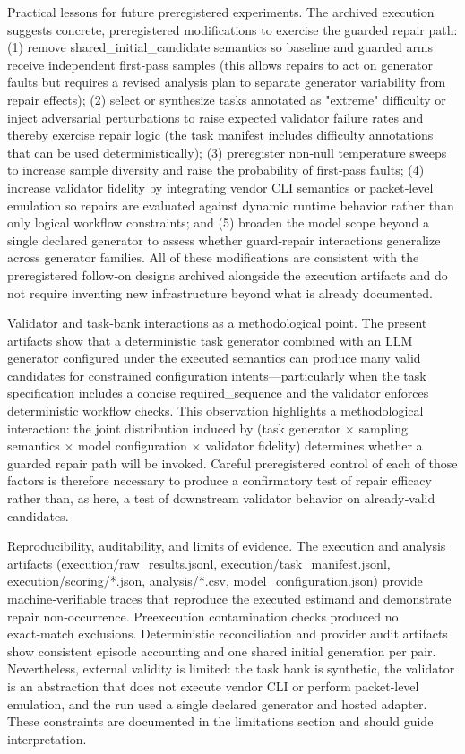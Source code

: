 \documentclass[conference]{IEEEtran}
\begin{document}
Practical lessons for future preregistered experiments. The archived execution suggests concrete, preregistered modifications to exercise the guarded repair path: (1) remove shared\_initial\_candidate semantics so baseline and guarded arms receive independent first‑pass samples (this allows repairs to act on generator faults but requires a revised analysis plan to separate generator variability from repair effects); (2) select or synthesize tasks annotated as "extreme" difficulty or inject adversarial perturbations to raise expected validator failure rates and thereby exercise repair logic (the task manifest includes difficulty annotations that can be used deterministically); (3) preregister non‑null temperature sweeps to increase sample diversity and raise the probability of first‑pass faults; (4) increase validator fidelity by integrating vendor CLI semantics or packet‑level emulation so repairs are evaluated against dynamic runtime behavior rather than only logical workflow constraints; and (5) broaden the model scope beyond a single declared generator to assess whether guard‑repair interactions generalize across generator families. All of these modifications are consistent with the preregistered follow‑on designs archived alongside the execution artifacts and do not require inventing new infrastructure beyond what is already documented.

Validator and task‑bank interactions as a methodological point. The present artifacts show that a deterministic task generator combined with an LLM generator configured under the executed semantics can produce many valid candidates for constrained configuration intents---particularly when the task specification includes a concise required\_sequence and the validator enforces deterministic workflow checks. This observation highlights a methodological interaction: the joint distribution induced by (task generator \ensuremath{\times} sampling semantics \ensuremath{\times} model configuration \ensuremath{\times} validator fidelity) determines whether a guarded repair path will be invoked. Careful preregistered control of each of those factors is therefore necessary to produce a confirmatory test of repair efficacy rather than, as here, a test of downstream validator behavior on already‑valid candidates.

Reproducibility, auditability, and limits of evidence. The execution and analysis artifacts (execution/raw\_results.jsonl, execution/task\_manifest.jsonl, execution/scoring/*.json, analysis/*.csv, model\_configuration.json) provide machine‑verifiable traces that reproduce the executed estimand and demonstrate repair non‑occurrence. Preexecution contamination checks produced no exact‑match exclusions. Deterministic reconciliation and provider audit artifacts show consistent episode accounting and one shared initial generation per pair. Nevertheless, external validity is limited: the task bank is synthetic, the validator is an abstraction that does not execute vendor CLI or perform packet‑level emulation, and the run used a single declared generator and hosted adapter. These constraints are documented in the limitations section and should guide interpretation.
\end{document}
